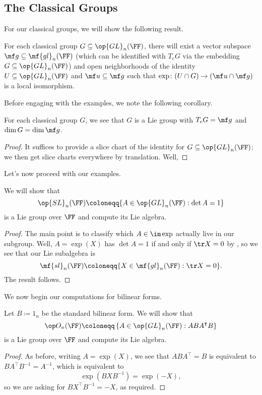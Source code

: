 \documentclass[../notes.tex]{subfiles}
\begin{document}
\subsection{The Classical Groups}
For our classical groups, we will show the following result.
\begin{theorem}
	For each classical group $G\subseteq\op{GL}_n(\FF)$, there will exist a vector subspace $\mf g\subseteq\mf{gl}_n(\FF)$ (which can be identified with $T_eG$ via the embedding $G\subseteq\op{GL}_n(\FF)$) and open neighborhoods of the identity $U\subseteq\op{GL}_n(\FF)$ and $\mf u\subseteq\mf g$ such that $\exp\colon(U\cap G)\to(\mf u\cap\mf g)$ is a local isomorphism.
\end{theorem}
Before engaging with the examples, we note the following corollary.
\begin{corollary}
	For each classical group $G$, we see that $G$ is a Lie group with $T_eG=\mf g$ and $\dim G=\dim\mf g$.
\end{corollary}
\begin{proof}
	It suffices to provide a slice chart of the identity for $G\subseteq\op{GL}_n(\FF)$; we then get slice charts everywhere by translation. Well, 
\end{proof}
Let's now proceed with our examples.
\begin{example}
	We will show that
	\[\op{SL}_n(\FF)\coloneqq\{A\in\op{GL}_n(\FF):\det A=1\}\]
	is a Lie group over $\FF$ and compute its Lie algebra.
\end{example}
\begin{proof}
	The main point is to classify which $A\in\im\exp$ actually live in our subgroup. Well, $A=\exp(X)$ has $\det A=1$ if and only if $\tr X=0$ by , so we see that our Lie subalgebra is
	\[\mf{sl}_n(\FF)\coloneqq\{X\in\mf{gl}_n(\FF):\tr X=0\}.\]
	The result follows.
\end{proof}
We now begin our computations for bilinear forms.
\begin{example}
	Let $B\coloneqq1_n$ be the standard bilinear form. We will show that
	\[\op O_n(\FF)\coloneqq\left\{A\in\op{GL}_n(\FF):ABA^\intercal B\right\}\]
	is a Lie group over $\FF$ and compute its Lie algebra.
\end{example}
\begin{proof}
	As before, writing $A=\exp(X)$, we see that $ABA^\intercal=B$ is equivalent to $BA^\intercal B^{-1}=A^{-1}$, which is equivalent to
	\[\exp\left(BXB^{-1}\right)=\exp(-X),\]
	so we are asking for $BX^\intercal B^{-1}=-X$, as required.
\end{proof}
\end{document}

